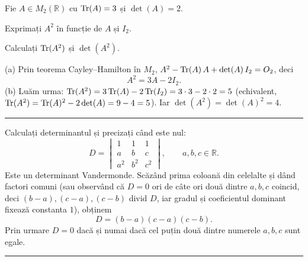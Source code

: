 
Fie $A\in M_2(\mathbb{R})$ cu $\operatorname{Tr}(A)=3$ și $\det(A)=2$.
\begin{parti}
  \item Exprimați $A^2$ în funcție de $A$ și $I_2$.
  \item Calculați $\operatorname{Tr}(A^2)$ și $\det(A^2)$.
\end{parti}
\sol (a) Prin teorema Cayley--Hamilton în $M_2$, $A^2-\operatorname{Tr}(A)\,A+\det(A)\,I_2=O_2$, deci
\[ A^2=3A-2I_2. \]
(b) Luăm urma: $\operatorname{Tr}(A^2)=3\operatorname{Tr}(A)-2\operatorname{Tr}(I_2)=3\cdot3-2\cdot2=5$ (echivalent, $\operatorname{Tr}(A^2)=\operatorname{Tr}(A)^2-2\det(A)=9-4=5$). Iar $\det(A^2)=\det(A)^2=4$.
\vspace{1mm}\hrule

Calculați determinantul și precizați când este nul:
\[ D=\begin{vmatrix} 1&1&1\\ a&b&c\\ a^2&b^2&c^2 \end{vmatrix},\qquad a,b,c\in\mathbb{R}. \]
\sol Este un determinant Vandermonde. Scăzând prima coloană din celelalte și dând factori comuni (sau observând că $D=0$ ori de câte ori două dintre $a,b,c$ coincid, deci $(b-a),(c-a),(c-b)$ divid $D$, iar gradul și coeficientul dominant fixează constanta $1$), obținem
\[ D=(b-a)(c-a)(c-b). \]
Prin urmare $D=0$ dacă și numai dacă cel puțin două dintre numerele $a,b,c$ sunt egale.
\vspace{1mm}\hrule

